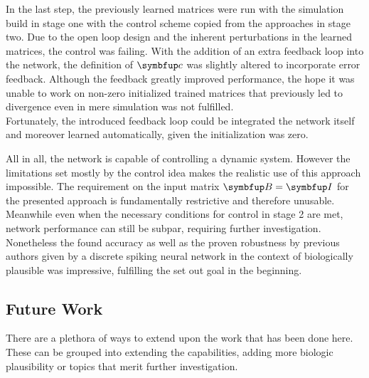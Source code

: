 In the last step, the previously learned matrices were run with the simulation build in stage one with the control scheme copied from the approaches in stage two. Due to the open loop design and the inherent perturbations in the learned matrices, the control was failing. With the addition of an extra feedback loop into the network, the definition of $\bmu{c}$ was slightly altered to incorporate error feedback.
Although the feedback greatly improved performance, the hope it was unable to work on non-zero initialized trained matrices that previously led to divergence even in mere simulation was not fulfilled.\\
Fortunately, the introduced feedback loop could be integrated the network itself and moreover learned automatically, given the initialization was zero.\\


All in all, the network is capable of controlling a dynamic system. However the limitations set mostly by the control idea makes the realistic use of this approach impossible. The requirement on the input matrix $\bmu{B} = \bmu{I}$ for the presented approach is fundamentally restrictive and therefore unusable. Meanwhile even when the necessary conditions for control in stage 2 are met, network performance can still be subpar, requiring further investigation.\\

Nonetheless the found accuracy as well as the proven robustness by previous authors given by a discrete spiking neural network in the context of biologically plausible was impressive, fulfilling the set out goal in the beginning.\\

\subsection{Future Work}

There are a plethora of ways to extend upon the work that has been done here. These can be grouped into extending the capabilities, adding more biologic plausibility or topics that merit further investigation.
